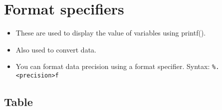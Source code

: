 \section{Format specifiers}
\begin{itemize}
    \item These are used to display the value of variables using printf(). 
    \item Also used to convert data. 
    \item You can format data precision using a format specifier. Syntax: \verb|%.<precision>f|
\end{itemize}
\subsection{Table}
